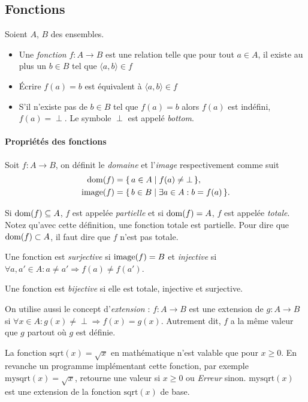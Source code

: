 
\subsection{Fonctions}
\label{subsec:fonctions}
Soient $A$, $B$ des ensembles.
\begin{itemize}
  	\item Une \emph{fonction} $f \colon A \rightarrow B$ est une relation telle que pour tout $a \in
	A$, il existe au plus un $b \in B$ tel que $\langle a,b \rangle \in f$
	\item Écrire $f(a)=b$ est équivalent à $\langle a,b \rangle \in f$
	\item S'il n'existe pas de $b \in B$ tel que $f(a)=b$ alors $f(a)$ est indéfini,
		$f(a) = \perp$.  Le symbole $\perp$ est appelé \emph{bottom}.
\end{itemize}

\paragraph{Propriétés des fonctions}
\label{par:proprietes_des_fonctions}
Soit $f\colon A \to B$, on définit le \emph{domaine} et l'\emph{image} respectivement comme suit
\begin{align*}
  \operatorname{dom}(f)   & = \{\, a \in A \mid f(a) \neq \bot \,\},\\
  \operatorname{image}(f) & = \{\, b \in B \mid \exists a \in A : b = f(a) \,\}.
\end{align*}

Si $\operatorname{dom}(f) \subseteq A$, $f$ est appelée \emph{partielle} et si $\operatorname{dom}(f) = A$, $f$ est appelée \emph{totale}.
Notez qu'avec cette définition, une fonction totale est partielle.
Pour dire que $\operatorname{dom}(f) \subset A$, il faut dire que $f$ n'est pas totale.

Une fonction est \emph{surjective} si $\operatorname{image}(f) = B$ et \emph{injective} si $\forall a,a' \in A : a \neq a' \Rightarrow f(a) \neq f(a')$.

Une fonction est \emph{bijective} si elle est totale, injective et surjective.

On utilise aussi le concept d'\emph{extension} :
$f: A \rightarrow B$ est une extension de $g: A \rightarrow B$ si $\forall x \in A : g(x)\neq \perp \Rightarrow f(x) = g(x)$.
Autrement dit, $f$ a la même valeur que $g$ partout où $g$ est définie.

La fonction $\mathrm{sqrt}(x) = \sqrt{x}$ en mathématique n'est valable que pour $x\geq0$. En revanche un programme implémentant cette fonction, par exemple $\mathrm{mysqrt}(x) = \sqrt{x}$, retourne une valeur si $x\geq0$ ou \textit{Erreur} sinon. $\mathrm{mysqrt}(x)$ est une extension de la fonction $\mathrm{sqrt}(x)$ de base.

